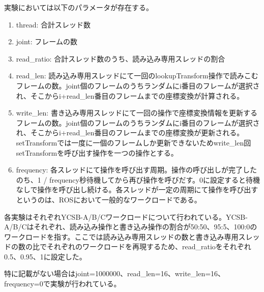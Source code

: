 \documentclass[a4paper]{jreport}	%
\begin{document}
実験においては以下のパラメータが存在する。
\begin{enumerate}
  \item thread: 合計スレッド数
  \item joint: フレームの数
  \item read\_ratio: 合計スレッド数のうち、読み込み専用スレッドの割合
  \item read\_len: 読み込み専用スレッドにて一回のlookupTransform操作で読みこむフレームの数。joint個のフレームのうちランダムにi番目のフレームが選択され、そこからi+read\_len番目のフレームまでの座標変換が計算される。
  \item write\_len: 書き込み専用スレッドにて一回の操作で座標変換情報を更新するフレームの数。joint個のフレームのうちランダムにi番目のフレームが選択され、そこからi+read\_len番目のフレームまでの座標変換が更新される。setTransformでは一度に一個のフレームしか更新できないためwrite\_len回setTransformを呼び出す操作を一つの操作とする。
  \item frequency: 各スレッドにて操作を呼び出す周期。操作の呼び出しが完了したのち、1 / frequency秒待機してから再び操作を呼びだす。0に設定すると待機なしで操作を呼び出し続ける。各スレッドが一定の周期にて操作を呼び出すというのは、ROSにおいて一般的なワークロードである。
\end{enumerate}



各実験はそれぞれYCSB-A/B/C\cite{ycsb}ワークロードについて行われている。YCSB-A/B/Cはそれぞれ、読み込み操作と書き込み操作の割合が50:50、95:5、100:0のワークロードを指す。ここでは読み込み専用スレッドの数と書き込み専用スレッドの数の比でそれぞれのワークロードを再現するため、read\_ratioをそれぞれ0.5、0.95、1に設定した。

特に記載がない場合はjoint=1000000、read\_len=16、write\_len=16、frequency=0で実験が行われている。
\end{document}
